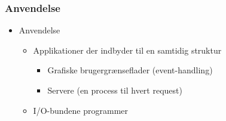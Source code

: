 \documentclass{beamer}
\begin{document}
\begin{frame}[fragile]
  \frametitle{Anvendelse}
  \begin{itemize}
    \item Anvendelse
    \begin{itemize}
      \item Applikationer der indbyder til en samtidig struktur
        \begin{itemize}
          \item Grafiske brugergrænseflader (event-handling)
          \item Servere (en process til hvert request)
        \end{itemize}
      \item I/O-bundene programmer
    \end{itemize}
  \end{itemize}
\end{frame}
\end{document}
